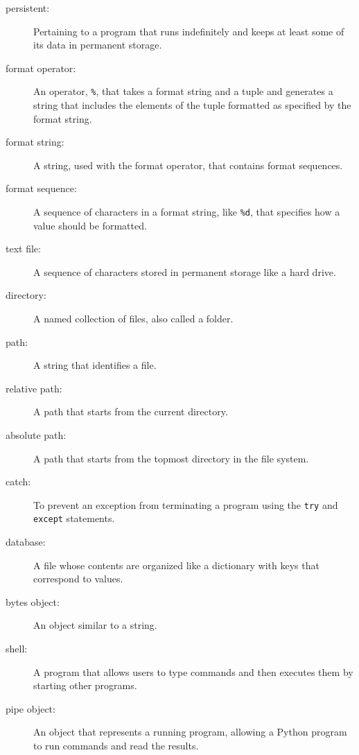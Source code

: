 \documentclass[10pt]{book}
\begin{document}
\begin{description}

\item[persistent:] Pertaining to a program that runs indefinitely
and keeps at least some of its data in permanent storage.

\item[format operator:] An operator, {\tt \%}, that takes a format
string and a tuple and generates a string that includes
the elements of the tuple formatted as specified by the format string.

\item[format string:] A string, used with the format operator, that
contains format sequences.

\item[format sequence:] A sequence of characters in a format string,
like {\tt \%d}, that specifies how a value should be formatted.

\item[text file:] A sequence of characters stored in permanent
storage like a hard drive.

\item[directory:] A named collection of files, also called a folder.

\item[path:] A string that identifies a file.

\item[relative path:] A path that starts from the current directory.

\item[absolute path:] A path that starts from the topmost directory
in the file system.

\item[catch:] To prevent an exception from terminating
a program using the {\tt try}
and {\tt except} statements.

\item[database:] A file whose contents are organized like a dictionary
with keys that correspond to values.

\item[bytes object:] An object similar to a string.

\item[shell:] A program that allows users to type commands and then
executes them by starting other programs.

\item[pipe object:] An object that represents a running program, allowing
a Python program to run commands and read the results.

\end{description}
\end{document}
